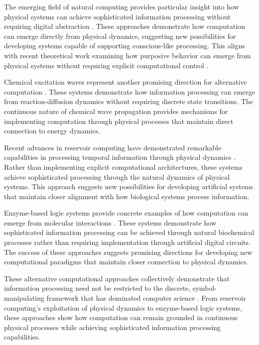 \begin{refsection}
The emerging field of natural computing provides particular insight into how physical systems can achieve sophisticated information processing without requiring digital abstraction \cite{Calude2018a}. These approaches demonstrate how computation can emerge directly from physical dynamics, suggesting new possibilities for developing systems capable of supporting conscious-like processing. This aligns with recent theoretical work examining how purposive behavior can emerge from physical systems without requiring explicit computational control \cite{Deacon2019}.

Chemical excitation waves represent another promising direction for alternative computation \cite{Gorecki2020}. These systems demonstrate how information processing can emerge from reaction-diffusion dynamics without requiring discrete state transitions. The continuous nature of chemical wave propagation provides mechanisms for implementing computation through physical processes that maintain direct connection to energy dynamics.

Recent advances in reservoir computing have demonstrated remarkable capabilities in processing temporal information through physical dynamics \cite{Jaeger2021}. Rather than implementing explicit computational architectures, these systems achieve sophisticated processing through the natural dynamics of physical systems. This approach suggests new possibilities for developing artificial systems that maintain closer alignment with how biological systems process information.

Enzyme-based logic systems provide concrete examples of how computation can emerge from molecular interactions \cite{Katz2019}. These systems demonstrate how sophisticated information processing can be achieved through natural biochemical processes rather than requiring implementation through artificial digital circuits. The success of these approaches suggests promising directions for developing new computational paradigms that maintain closer connection to physical dynamics.

These alternative computational approaches collectively demonstrate that information processing need not be restricted to the discrete, symbol-manipulating framework that has dominated computer science \cite{Levin2018}. From reservoir computing's exploitation of physical dynamics to enzyme-based logic systems, these approaches show how computation can remain grounded in continuous physical processes while achieving sophisticated information processing capabilities.


\end{refsection}
